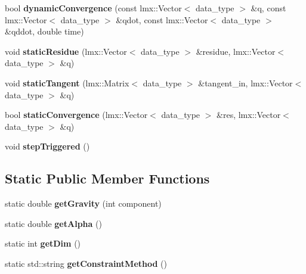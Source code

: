\begin{CompactItemize}
\item 
\hypertarget{classmknix_1_1Simulation_0bb5d6c4c6eccc35e892b710af40616f}{
bool \textbf{dynamicConvergence} (const lmx::Vector$<$ data\_\-type $>$ \&q, const lmx::Vector$<$ data\_\-type $>$ \&qdot, const lmx::Vector$<$ data\_\-type $>$ \&qddot, double time)}
\label{classmknix_1_1Simulation_0bb5d6c4c6eccc35e892b710af40616f}

\item 
\hypertarget{classmknix_1_1Simulation_1a65d519f553ac9d060c526ae508f152}{
void \textbf{staticResidue} (lmx::Vector$<$ data\_\-type $>$ \&residue, lmx::Vector$<$ data\_\-type $>$ \&q)}
\label{classmknix_1_1Simulation_1a65d519f553ac9d060c526ae508f152}

\item 
\hypertarget{classmknix_1_1Simulation_4ec8a62eed31911238142b362f60f43e}{
void \textbf{staticTangent} (lmx::Matrix$<$ data\_\-type $>$ \&tangent\_\-in, lmx::Vector$<$ data\_\-type $>$ \&q)}
\label{classmknix_1_1Simulation_4ec8a62eed31911238142b362f60f43e}

\item 
\hypertarget{classmknix_1_1Simulation_3a9b6e1b8cf5a63ad6e3a7d2cce5d171}{
bool \textbf{staticConvergence} (lmx::Vector$<$ data\_\-type $>$ \&res, lmx::Vector$<$ data\_\-type $>$ \&q)}
\label{classmknix_1_1Simulation_3a9b6e1b8cf5a63ad6e3a7d2cce5d171}

\item 
\hypertarget{classmknix_1_1Simulation_9fd95351d7fe3ce2ba1991d6aae6a804}{
void \textbf{stepTriggered} ()}
\label{classmknix_1_1Simulation_9fd95351d7fe3ce2ba1991d6aae6a804}

\end{CompactItemize}
\subsection*{Static Public Member Functions}
\begin{CompactItemize}
\item 
\hypertarget{classmknix_1_1Simulation_e1eca795584573082535d83d0705af29}{
static double \textbf{getGravity} (int component)}
\label{classmknix_1_1Simulation_e1eca795584573082535d83d0705af29}

\item 
\hypertarget{classmknix_1_1Simulation_c2dcb63d177765da23658f6a552ad124}{
static double \textbf{getAlpha} ()}
\label{classmknix_1_1Simulation_c2dcb63d177765da23658f6a552ad124}

\item 
\hypertarget{classmknix_1_1Simulation_dda4efbeb29fecf80bcd8552703bfed4}{
static int \textbf{getDim} ()}
\label{classmknix_1_1Simulation_dda4efbeb29fecf80bcd8552703bfed4}

\item 
\hypertarget{classmknix_1_1Simulation_4f86c458f83403c391f10495dd15f9e9}{
static std::string \textbf{getConstraintMethod} ()}
\label{classmknix_1_1Simulation_4f86c458f83403c391f10495dd15f9e9}

\end{CompactItemize}
